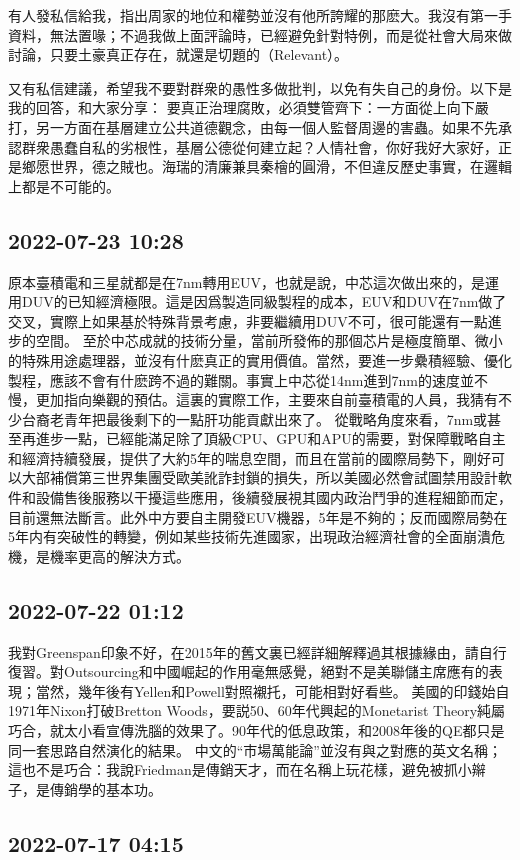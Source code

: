 \documentclass[twocolumn]{ctexart}
\begin{document}
有人發私信給我，指出周家的地位和權勢並沒有他所誇耀的那麽大。我沒有第一手資料，無法置喙；不過我做上面評論時，已經避免針對特例，而是從社會大局來做討論，只要土豪真正存在，就還是切題的（Relevant）。

又有私信建議，希望我不要對群衆的愚性多做批判，以免有失自己的身份。以下是我的回答，和大家分享：
要真正治理腐敗，必須雙管齊下：一方面從上向下嚴打，另一方面在基層建立公共道德觀念，由每一個人監督周邊的害蟲。如果不先承認群衆愚蠢自私的劣根性，基層公德從何建立起？人情社會，你好我好大家好，正是鄉愿世界，德之賊也。海瑞的清廉兼具秦檜的圓滑，不但違反歷史事實，在邏輯上都是不可能的。
\subsection*{2022-07-23 10:28}

原本臺積電和三星就都是在7nm轉用EUV，也就是說，中芯這次做出來的，是運用DUV的已知經濟極限。這是因爲製造同級製程的成本，EUV和DUV在7nm做了交叉，實際上如果基於特殊背景考慮，非要繼續用DUV不可，很可能還有一點進步的空間。
至於中芯成就的技術分量，當前所發佈的那個芯片是極度簡單、微小的特殊用途處理器，並沒有什麽真正的實用價值。當然，要進一步纍積經驗、優化製程，應該不會有什麽跨不過的難關。事實上中芯從14nm進到7nm的速度並不慢，更加指向樂觀的預估。這裏的實際工作，主要來自前臺積電的人員，我猜有不少台裔老青年把最後剩下的一點肝功能貢獻出來了。
從戰略角度來看，7nm或甚至再進步一點，已經能滿足除了頂級CPU、GPU和APU的需要，對保障戰略自主和經濟持續發展，提供了大約5年的喘息空間，而且在當前的國際局勢下，剛好可以大部補償第三世界集團受歐美訛詐封鎖的損失，所以美國必然會試圖禁用設計軟件和設備售後服務以干擾這些應用，後續發展視其國内政治鬥爭的進程細節而定，目前還無法斷言。此外中方要自主開發EUV機器，5年是不夠的；反而國際局勢在5年内有突破性的轉變，例如某些技術先進國家，出現政治經濟社會的全面崩潰危機，是機率更高的解決方式。
\subsection*{2022-07-22 01:12}

我對Greenspan印象不好，在2015年的舊文裏已經詳細解釋過其根據緣由，請自行復習。對Outsourcing和中國崛起的作用毫無感覺，絕對不是美聯儲主席應有的表現；當然，幾年後有Yellen和Powell對照襯托，可能相對好看些。
美國的印錢始自1971年Nixon打破Bretton Woods，要説50、60年代興起的Monetarist Theory純屬巧合，就太小看宣傳洗腦的效果了。90年代的低息政策，和2008年後的QE都只是同一套思路自然演化的結果。
中文的“市場萬能論”並沒有與之對應的英文名稱；這也不是巧合：我說Friedman是傳銷天才，而在名稱上玩花樣，避免被抓小辮子，是傳銷學的基本功。
\subsection*{2022-07-17 04:15}
\end{document}

